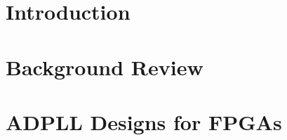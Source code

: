 \documentclass[11pt,british]{report}
\begin{document}
\setcounter{page}{1} 
	
\pagestyle{fancy}

\fancyhead{} 

\fancyhead[LE,RO]{\slshape \nouppercase{\rightmark}} 

\fancyhead[LO,RE]{\slshape \nouppercase{\leftmark}}

\setcounter{chapter}{0}

\chapter{Introduction}\label{chap:1}


\setcounter{chapter}{1}

\chapter{Background Review}\label{chap:2}



\setcounter{chapter}{2}

\chapter{ADPLL Designs for FPGAs}\label{chap:3}



\setcounter{chapter}{2}
%
%
%
%
\pagebreak{}
{}
\fancyhead[LO,RE]{\slshape \nouppercase{\leftmark}}

\end{document}
